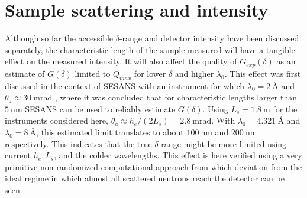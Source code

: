 \section{Sample scattering and intensity}
\label{c4.4}
Although so far the accessible $\delta$-range and detector intensity have been discussed separately, the characteristic length of the sample measured will have a tangible effect on the measured intensity. It will also affect the quality of $G_{exp}(\delta)$ as an estimate of $G(\delta)$ limited to $Q_{max}$ for lower $\delta$ and higher $\lambda_0$. This effect was first discussed in the context of SESANS with an instrument for which $\lambda_0 = \SI{2}{\angstrom}$ and $\theta_a \approx \SI{30}{\milli\radian}$ \cite{rekveldt1996}, where it was concluded that for characteristic lengths larger than $\SI{5}{\nano\meter}$ SESANS can be used to reliably estimate $G(\delta)$. Using $L_s = \SI{1.8}{\meter}$ for the instruments considered here, $\theta_a \approx h_e / (2L_s) = \SI{2.8}{\milli\radian}$. With $\lambda_0 = \SI{4.321}{\angstrom}$ and $\lambda_0 =  \SI{8}{\angstrom}$, this estimated limit translates to about $\SI{100}{\nano\meter}$ and $\SI{200}{\nano\meter}$ respectively. This indicates that the true $\delta$-range might be more limited using current $h_e, L_s$, and the colder wavelengths. This effect is here verified using a very primitive non-randomized computational approach from which deviation from the ideal regime in which almost all scattered neutrons reach the detector \cite{rekveldt1996} can be seen. 
